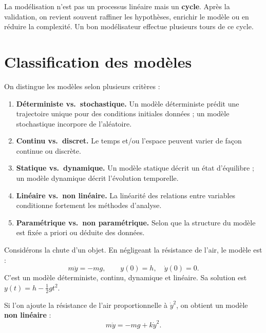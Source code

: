 \begin{intuition}[title=\textbf{Le cycle de mod\'elisation}]
La mod\'elisation n'est pas un processus lin\'eaire mais un \textbf{cycle}.
Apr\`es la validation, on revient souvent raffiner les hypoth\`eses,
enrichir le mod\`ele ou en r\'eduire la complexit\'e.  Un bon mod\'elisateur
effectue plusieurs tours de ce cycle.
\end{intuition}

\section{Classification des mod\`eles}
\label{sec:classification}

\begin{definition}
On distingue les mod\`eles selon plusieurs crit\`eres :
\begin{enumerate}
  \item \textbf{D\'eterministe vs.\ stochastique.}
    Un mod\`ele d\'eterministe pr\'edit une trajectoire unique pour des
    conditions initiales donn\'ees ; un mod\`ele stochastique incorpore
    de l'al\'eatoire.
  \item \textbf{Continu vs.\ discret.}
    Le temps et/ou l'espace peuvent varier de fa\c{c}on continue ou discr\`ete.
  \item \textbf{Statique vs.\ dynamique.}
    Un mod\`ele statique d\'ecrit un \'etat d'\'equilibre ; un mod\`ele
    dynamique d\'ecrit l'\'evolution temporelle.
  \item \textbf{Lin\'eaire vs.\ non lin\'eaire.}
    La lin\'earit\'e des relations entre variables conditionne fortement
    les m\'ethodes d'analyse.
  \item \textbf{Param\'etrique vs.\ non param\'etrique.}
    Selon que la structure du mod\`ele est fix\'ee a priori ou
    d\'eduite des donn\'ees.
\end{enumerate}
\end{definition}

\begin{exemple}
Consid\'erons la chute d'un objet. En n\'egligeant la r\'esistance de
l'air, le mod\`ele est :
\[
  m\ddot{y} = -mg, \qquad y(0)=h,\quad \dot{y}(0)=0.
\]
C'est un mod\`ele d\'eterministe, continu, dynamique et lin\'eaire.
Sa solution est $y(t)=h-\tfrac{1}{2}gt^2$.

Si l'on ajoute la r\'esistance de l'air proportionnelle \`a $\dot{y}^2$,
on obtient un mod\`ele \textbf{non lin\'eaire} :
\[
  m\ddot{y} = -mg + k\dot{y}^2.
\]
\end{exemple}

